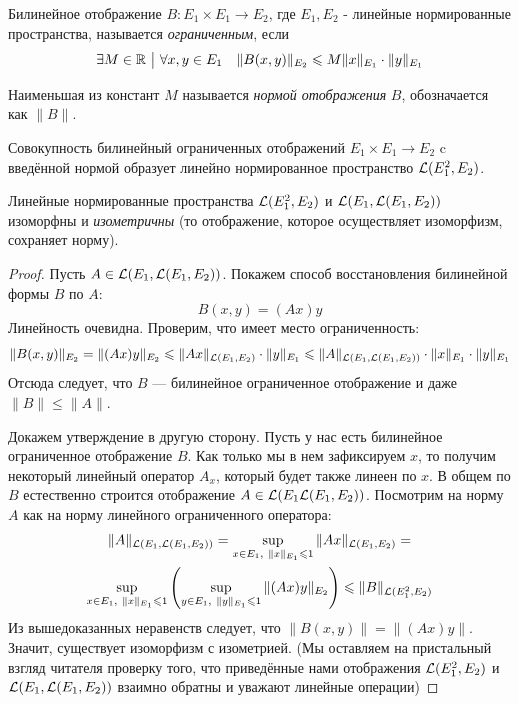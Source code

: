 \begin{definition}
    Билинейное отображение $B\colon E_1 \times E_1 \to E_2$, где  $E_1, E_2$ - линейные нормированные пространства, называется \textit{ограниченным}, если 
    \[
        \exists M \in \mathbb{R} \ \big|\  \forall x, y \in E_1 \quad \|B(x, y)\|_{E_2} \leqslant M \|x\|_{E_1} \cdot \|y\|_{E_1}
    \]
\end{definition}

\begin{definition}
    Наименьшая из констант $M$ называется \textit{нормой отображения} $B$, обозначается как $\|B\|$.
\end{definition}

\begin{note}
	Совокупность билинейный ограниченных отображений $E_1 \times E_1 \to E_2$ c введённой нормой образует линейно нормированное пространство $\mathcal{L}(E_1^2, E_2)$.
\end{note}

\begin{proposition}
    Линейные нормированные пространства $\mathcal{L}(E_1^2, E_2)$ и $\mathcal{L}(E_1, \mathcal{L}(E_1, E_2))$ изоморфны и \textit{изометричны} (то отображение, которое осуществляет изоморфизм, сохраняет норму).
\end{proposition}

\begin{proof}
    Пусть $A \in \mathcal{L}(E_1, \mathcal{L}(E_1, E_2))$. Покажем способ восстановления билинейной формы $B$ по $A$:
    \[
        B(x, y)=(Ax)y
    \]
    Линейность очевидна. Проверим, что имеет место ограниченность:
    \[
        \|B(x, y)\|_{E_2}=\|(Ax)y\|_{E_2} \leqslant \|Ax\|_{\mathcal{L}(E_1, E_2)} \cdot \|y\|_{E_1} \leqslant \|A\|_{\mathcal{L}(E_1, \mathcal{L}(E_1, E_2))} \cdot \|x\|_{E_1} \cdot \|y\|_{E_1}
    \]
    Отсюда следует, что $B$ --- билинейное ограниченное отображение и даже $\|B\| \leq \|A\|$.
    
    Докажем утверждение в другую сторону. Пусть у нас есть билинейное ограниченное отображение $B$. Как только мы в нем зафиксируем $x$, то получим некоторый линейный оператор $A_x$, который будет также линеен по $x$. В общем по $B$ естественно строится отображение $A\in\mathcal{L}(E_1\mathcal{L}(E_1, E_2))$. Посмотрим на норму $A$ как на норму линейного ограниченного оператора:
    \begin{multline*}
        \|A\|_{\Lin(E_1, \Lin(E_1, E_2))} = \sup_{x \in E_1,\ \|x\|_{E_1} \leq 1} \|A x\|_{\Lin(E_1, E_2)} =
        \\
        \sup_{x \in E_1,\ \|x\|_{E_1} \leq 1} \ps{\sup_{y \in E_1,\ \|y\|_{E_1} \leq 1} \|(Ax)y \|_{E_2}} \leq \|B\|_{\Lin(E_1^2, E_2)}
    \end{multline*}
    Из вышедоказанных неравенств следует, что $\|B(x, y)\| = \|(Ax)y\|$. Значит, существует изоморфизм с изометрией. (Мы оставляем на пристальный взгляд читателя проверку того, что приведённые нами отображения $\mathcal{L}(E_1^2, E_2)$ и $\mathcal{L}(E_1, \mathcal{L}(E_1, E_2))$ взаимно обратны и уважают линейные операции)
\end{proof}

